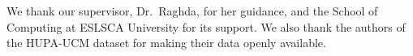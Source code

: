 We thank our supervisor, Dr.~Raghda, for her guidance, and the School of Computing at ESLSCA University for its support. We also thank the authors of the HUPA-UCM dataset for making their data openly available.
